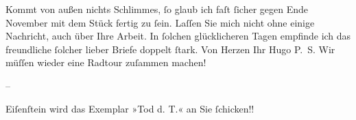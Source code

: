 \pstart
           Kommt von außen nichts Schlimmes, ſo glaub ich faſt ſicher gegen Ende
                  November mit dem Stück fertig zu {\pb}ſein.
               Laſſen Sie mich nicht ohne einige Nachricht, auch über Ihre Arbeit. In ſolchen
               glücklicheren Tagen empfinde ich das freundliche ſolcher lieber Briefe doppelt ſtark.
               Von Herzen Ihr\pend
           \pstart \spacefill\mbox{Hugo}\pend{}
\pstart
           \noindent{}P. S. Wir müſſen wieder eine Radtour zuſammen machen!\pend
           
\pstart
           \numberlinefalse{}\centering{}–\numberlinetrue{}\pend
           
\pstart
           Eiſenſtein wird das Exemplar »Tod d. T.« an Sie ſchicken!!\pend
           \endnumbering{}  
      